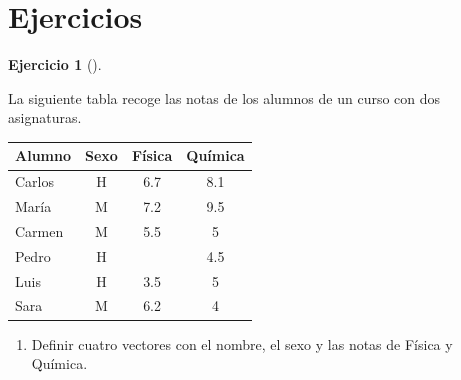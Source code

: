 \documentclass[
  spanish,
  a4paper,
]{scrreport}
\newcounter{none} %
\theoremstyle{definition}
\newtheorem{exercise}{Ejercicio}[chapter]
\theoremstyle{definition}
\theoremstyle{remark}
\begin{document}
\section{Ejercicios}\label{ejercicios-1}

\begin{exercise}[]\protect\hypertarget{exr-datos-estructurados-1}{}\label{exr-datos-estructurados-1}

La siguiente tabla recoge las notas de los alumnos de un curso con dos
asignaturas.

{\def\LTcaptype{none} %
\begin{longtable}[]{@{}lccc@{}}
\toprule\noalign{}
Alumno & Sexo & Física & Química \\
\midrule\noalign{}
\endhead
\bottomrule\noalign{}
\endlastfoot
Carlos & H & 6.7 & 8.1 \\
María & M & 7.2 & 9.5 \\
Carmen & M & 5.5 & 5 \\
Pedro & H & & 4.5 \\
Luis & H & 3.5 & 5 \\
Sara & M & 6.2 & 4 \\
\end{longtable}
}

\begin{enumerate}
\def\labelenumi{\alph{enumi}.}
\item
  Definir cuatro vectores con el nombre, el sexo y las notas de Física y
  Química.

  \begin{tcolorbox}[enhanced jigsaw, arc=.35mm, bottomrule=.15mm, bottomtitle=1mm, breakable, colback=white, colbacktitle=quarto-callout-note-color!10!white, colframe=quarto-callout-note-color-frame, coltitle=black, left=2mm, leftrule=.75mm, opacityback=0, opacitybacktitle=0.6, rightrule=.15mm, title=\textcolor{quarto-callout-note-color}{\faInfo}\hspace{0.5em}{Solución}, titlerule=0mm, toprule=.15mm, toptitle=1mm]


\end{tcolorbox}
\end{enumerate}
\end{exercise}
\end{document}
